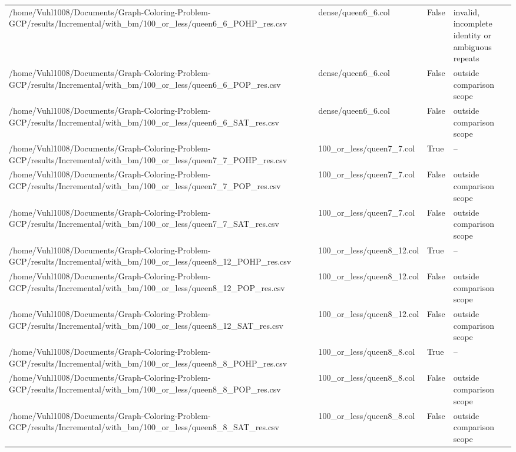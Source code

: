 \begin{table}[htbp]
\begin{tabular}{llll}
/home/Vuhl1008/Documents/Graph-Coloring-Problem-GCP/results/Incremental/with\_bm/100\_or\_less/queen6\_6\_POHP\_res.csv & dense/queen6\_6.col & False & invalid, incomplete identity or ambiguous repeats \\
/home/Vuhl1008/Documents/Graph-Coloring-Problem-GCP/results/Incremental/with\_bm/100\_or\_less/queen6\_6\_POP\_res.csv & dense/queen6\_6.col & False & outside comparison scope \\
/home/Vuhl1008/Documents/Graph-Coloring-Problem-GCP/results/Incremental/with\_bm/100\_or\_less/queen6\_6\_SAT\_res.csv & dense/queen6\_6.col & False & outside comparison scope \\
/home/Vuhl1008/Documents/Graph-Coloring-Problem-GCP/results/Incremental/with\_bm/100\_or\_less/queen7\_7\_POHP\_res.csv & 100\_or\_less/queen7\_7.col & True & -- \\
/home/Vuhl1008/Documents/Graph-Coloring-Problem-GCP/results/Incremental/with\_bm/100\_or\_less/queen7\_7\_POP\_res.csv & 100\_or\_less/queen7\_7.col & False & outside comparison scope \\
/home/Vuhl1008/Documents/Graph-Coloring-Problem-GCP/results/Incremental/with\_bm/100\_or\_less/queen7\_7\_SAT\_res.csv & 100\_or\_less/queen7\_7.col & False & outside comparison scope \\
/home/Vuhl1008/Documents/Graph-Coloring-Problem-GCP/results/Incremental/with\_bm/100\_or\_less/queen8\_12\_POHP\_res.csv & 100\_or\_less/queen8\_12.col & True & -- \\
/home/Vuhl1008/Documents/Graph-Coloring-Problem-GCP/results/Incremental/with\_bm/100\_or\_less/queen8\_12\_POP\_res.csv & 100\_or\_less/queen8\_12.col & False & outside comparison scope \\
/home/Vuhl1008/Documents/Graph-Coloring-Problem-GCP/results/Incremental/with\_bm/100\_or\_less/queen8\_12\_SAT\_res.csv & 100\_or\_less/queen8\_12.col & False & outside comparison scope \\
/home/Vuhl1008/Documents/Graph-Coloring-Problem-GCP/results/Incremental/with\_bm/100\_or\_less/queen8\_8\_POHP\_res.csv & 100\_or\_less/queen8\_8.col & True & -- \\
/home/Vuhl1008/Documents/Graph-Coloring-Problem-GCP/results/Incremental/with\_bm/100\_or\_less/queen8\_8\_POP\_res.csv & 100\_or\_less/queen8\_8.col & False & outside comparison scope \\
/home/Vuhl1008/Documents/Graph-Coloring-Problem-GCP/results/Incremental/with\_bm/100\_or\_less/queen8\_8\_SAT\_res.csv & 100\_or\_less/queen8\_8.col & False & outside comparison scope \\

\end{tabular}
\end{table}
